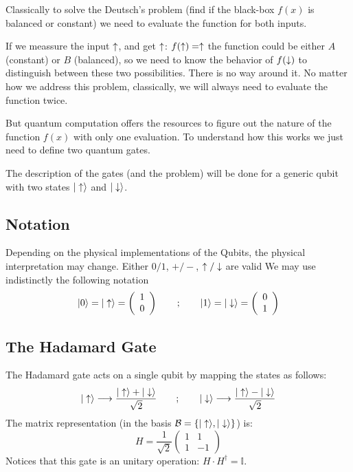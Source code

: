 Classically to solve the Deutsch's problem (find if the black-box $f(x)$ is balanced or constant) we need to evaluate the function for both inputs.

If we meassure the input $\uparrow$, and get $\uparrow$: $f(\uparrow)=\uparrow$ the function could be either $A$ (constant) or $B$ (balanced), so we need to know the behavior of $f(\downarrow)$ to distinguish between these two possibilities.
There is no way around it. No matter how we address this problem, classically, we will always need to evaluate the function twice.

But quantum computation offers the resources to figure out the nature of the function $f(x)$ with only one evaluation. To understand how this works we just need to define two quantum gates.

The description of the gates (and the problem) will be done for a generic qubit with two states $|\uparrow\rangle$ and $|\downarrow\rangle$.

\subsection{Notation}
Depending on the physical implementations of the Qubits, the physical interpretation may change. Either $0/1$, $+/-$, $\uparrow/\downarrow$ are valid We may use indistinctly the following notation
\begin{equation}
  |0\rangle = |\uparrow\rangle =
  \left(\begin{array}{c}
        1 \\
        0
        \end{array}\right)
\qquad;\qquad
  |1\rangle = |\downarrow\rangle =
  \left(\begin{array}{c}
        0 \\
        1
        \end{array}\right)
\end{equation}



\subsection{The Hadamard Gate}
The Hadamard gate acts on a single qubit by mapping the states as follows:
\begin{equation}
  |\uparrow\rangle \longrightarrow \frac{|\uparrow\rangle+|\downarrow\rangle}{\sqrt{2}}
  \quad\quad;\quad\quad
  |\downarrow\rangle \longrightarrow \frac{|\uparrow\rangle-|\downarrow\rangle}{\sqrt{2}}
\label{Hmap}
\end{equation}
The matrix representation (in the basis $\mathcal{B}=\left\{|\uparrow\rangle,|\downarrow\rangle\right\}$) is:
\begin{equation}
  H=\frac{1}{\sqrt{2}}\left(\begin{array}{cc}
  1 & 1 \\
  1 & -1
  \end{array}\right)
\label{hadamard}
\end{equation}
Notices that this gate is an unitary operation: $H\cdot H^{\dagger}=\mathbb{I}$.


